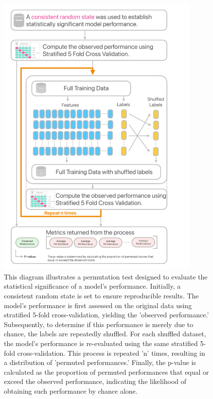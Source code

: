 \documentclass[12pt,a4paper]{report}
\begin{document}
\begin{figure}[H]
  \centering
  \includegraphics[width=0.9\textwidth]{images/P-value_test-1.png}
  \caption[Evaluating model significance via permutation testing and p-value calculation diagram]{This diagram illustrates a permutation test designed to evaluate the statistical significance of a model's performance. Initially, a consistent random state is set to ensure reproducible results. The model's performance is first assessed on the original data using stratified 5-fold cross-validation, yielding the 'observed performance.' Subsequently, to determine if this performance is merely due to chance, the labels are repeatedly shuffled. For each shuffled dataset, the model's performance is re-evaluated using the same stratified 5-fold cross-validation. This process is repeated 'n' times, resulting in a distribution of 'permuted performances.' Finally, the p-value is calculated as the proportion of permuted performances that equal or exceed the observed performance, indicating the likelihood of obtaining such performance by chance alone.}
  \label{fig:P-value_test-1}
\end{figure}
\end{document}
